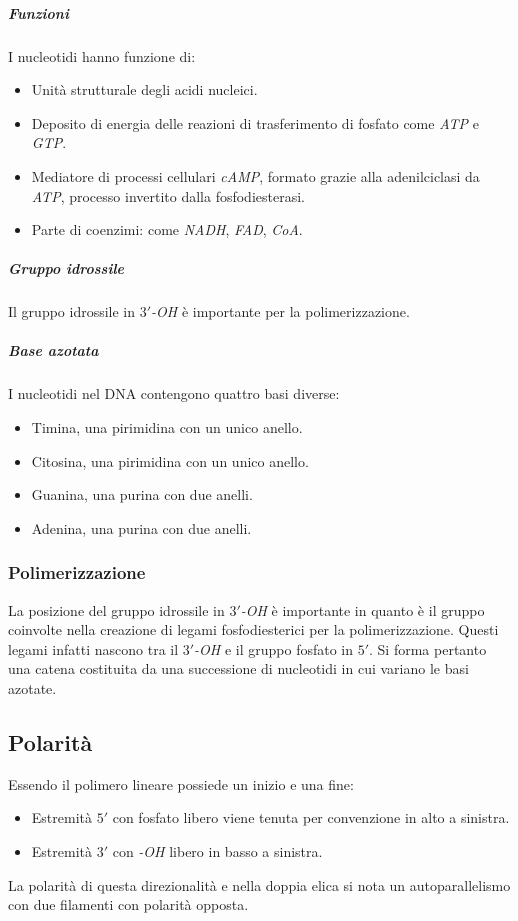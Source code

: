 				\subparagraph{Funzioni}
				I nucleotidi hanno funzione di:
				\begin{multicols}{2}
					\begin{itemize}
						\item Unit\`a strutturale degli acidi nucleici.
						\item Deposito di energia delle reazioni di trasferimento di fosfato come \emph{ATP} e \emph{GTP}.
						\item Mediatore di processi cellulari \emph{cAMP}, formato grazie alla adenilciclasi da \emph{ATP}, processo invertito dalla fosfodiesterasi.
						\item Parte di coenzimi: come \emph{NADH}, \emph{FAD}, \emph{CoA}.
					\end{itemize}
				\end{multicols}

				\subparagraph{Gruppo idrossile}
				Il gruppo idrossile in \emph{$3'$-OH} \`e importante per la polimerizzazione.
				
				\subparagraph{Base azotata}
				I nucleotidi nel DNA contengono quattro basi diverse:
				\begin{multicols}{2}
					\begin{itemize}
						\item Timina, una pirimidina con un unico anello.
						\item Citosina, una pirimidina con un unico anello.
						\item Guanina, una purina con due anelli.
						\item Adenina, una purina con due anelli.
					\end{itemize}
				\end{multicols}

		\subsubsection{Polimerizzazione}
		La posizione del gruppo idrossile in \emph{$3'$-OH} \`e importante in quanto \`e il gruppo coinvolte nella creazione di legami fosfodiesterici per la polimerizzazione.
		Questi legami infatti nascono tra il \emph{$3'$-OH} e il gruppo fosfato in $5'$.
		Si forma pertanto una catena costituita da una successione di nucleotidi in cui variano le basi azotate.
		
	\subsection{Polarit\`a}
	Essendo il polimero lineare possiede un inizio e una fine:
	\begin{multicols}{2}
		\begin{itemize}
			\item Estremit\`a $5'$ con fosfato libero viene tenuta per convenzione in alto a sinistra.
			\item Estremit\`a $3'$ con \emph{-OH} libero in basso a sinistra.
		\end{itemize}
	\end{multicols}
	La polarit\`a di questa direzionalit\`a e nella doppia elica si nota un autoparallelismo con due filamenti con polarit\`a opposta.

